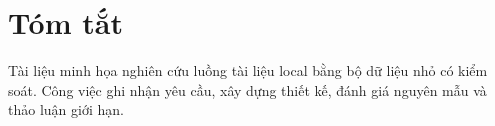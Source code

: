 \chapter*{Tóm tắt}
Tài liệu minh họa nghiên cứu luồng tài liệu local bằng bộ dữ liệu nhỏ có kiểm soát. Công việc ghi nhận yêu cầu, xây dựng thiết kế, đánh giá nguyên mẫu và thảo luận giới hạn.


